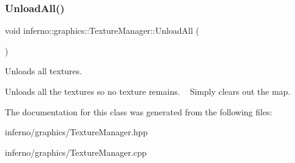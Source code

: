 \subsubsection{\texorpdfstring{Unload\+All()}{UnloadAll()}}
{\footnotesize\ttfamily void inferno\+::graphics\+::\+Texture\+Manager\+::\+Unload\+All (\begin{DoxyParamCaption}{ }\end{DoxyParamCaption})}



Unloads all textures. 

Unloads all the textures so no texture remains. ~\newline
Simply clears out the map. 

The documentation for this class was generated from the following files\+:\begin{DoxyCompactItemize}
\item 
inferno/graphics/Texture\+Manager.\+hpp\item 
inferno/graphics/Texture\+Manager.\+cpp\end{DoxyCompactItemize}
